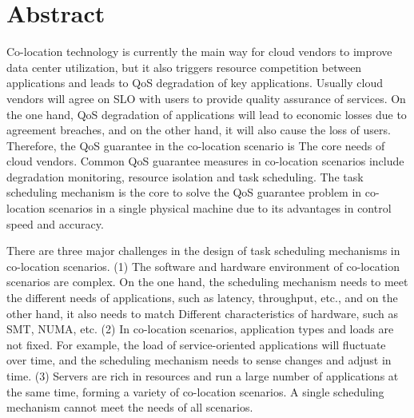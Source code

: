 \intobmk\chapter*{Abstract}%

Co-location technology is currently the main way for cloud vendors to improve data center utilization, but it also triggers resource competition between applications and leads to QoS degradation of key applications. Usually cloud vendors will agree on SLO with users to provide quality assurance of services. On the one hand, QoS degradation of applications will lead to economic losses due to agreement breaches, and on the other hand, it will also cause the loss of users. Therefore, the QoS guarantee in the co-location scenario is The core needs of cloud vendors. Common QoS guarantee measures in co-location scenarios include degradation monitoring, resource isolation and task scheduling. The task scheduling mechanism is the core to solve the QoS guarantee problem in co-location scenarios in a single physical machine due to its advantages in control speed and accuracy.

There are three major challenges in the design of task scheduling mechanisms in co-location scenarios. (1) The software and hardware environment of co-location scenarios are complex. On the one hand, the scheduling mechanism needs to meet the different needs of applications, such as latency, throughput, etc., and on the other hand, it also needs to match Different characteristics of hardware, such as SMT, NUMA, etc. (2) In co-location scenarios, application types and loads are not fixed. For example, the load of service-oriented applications will fluctuate over time, and the scheduling mechanism needs to sense changes and adjust in time. (3) Servers are rich in resources and run a large number of applications at the same time, forming a variety of co-location scenarios. A single scheduling mechanism cannot meet the needs of all scenarios.

